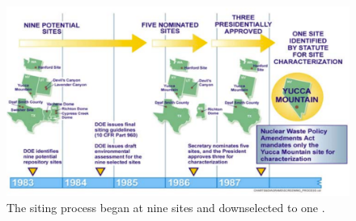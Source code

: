 \begin{figure}[htbp!]
  \begin{center}
    \includegraphics{nine_sites_to_one.eps}
  \end{center}
  \caption{The siting process began at nine sites and downselected to one 
    \cite{peters_what_2013}.}
  \label{fig:nine_sites_to_one}
\end{figure}
